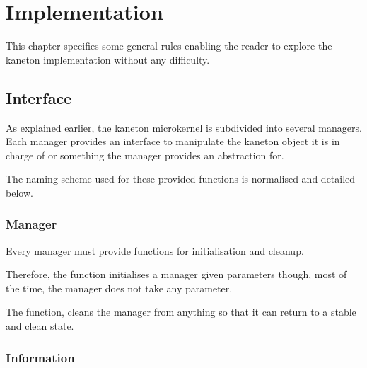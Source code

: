 %
%
%
%
%
%

%
%

\chapter{Implementation}
\label{chapter:implementation}

This chapter specifies some general rules enabling the reader to explore
the kaneton implementation without any difficulty.

\newpage

%
%

%
%

\section{Interface}

As explained earlier, the kaneton microkernel is subdivided into several
managers. Each manager provides an interface to manipulate the kaneton object
it is in charge of or something the manager provides an abstraction for.

The naming scheme used for these provided functions is normalised and
detailed below.


\subsection*{Manager}

Every manager must provide functions for initialisation and cleanup.

Therefore, the  function initialises a manager given
parameters though, most of the time, the manager does not take any parameter.

The  function, cleans the manager from anything so that it
can return to a stable and clean state.


\subsection*{Information}

